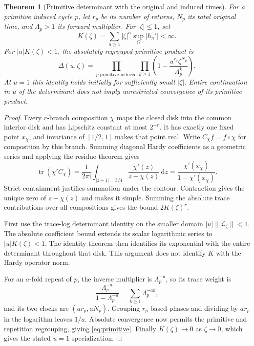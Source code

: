 \documentclass[10pt]{article}
\newcommand{\dd}{\,\mathrm d}
\newcommand{\ii}{\mathrm i}
\newcommand{\LL}{\mathcal L}
\newcommand{\tr}{\operatorname{tr}}
\newtheorem{theorem}{Theorem}
\begin{document}
\begin{theorem}[Primitive determinant with the original and induced times]
For a primitive induced cycle $p$, let $r_p$ be its number of returns,
$N_p$ its total original time, and $\Lambda_p>1$ its forward multiplier.
For $|\zeta|\le1$, set
\begin{equation}
K(\zeta)=\sum_{n\ge1}|\zeta|^n\sup_\Omega|h_n'|<\infty.
\label{eq:K}
\end{equation}
For $|u|K(\zeta)<1$, the absolutely regrouped primitive product is
\begin{equation}
\Delta(u,\zeta)=
\prod_{p\;\text{primitive induced}}\prod_{k\ge1}
\left(1-\frac{u^{r_p}\zeta^{N_p}}{\Lambda_p^k}\right).
\label{eq:primitive}
\end{equation}
At $u=1$ this identity holds initially for sufficiently small $|\zeta|$.
Entire continuation in $u$ of the determinant does not imply unrestricted
convergence of its primitive product.
\end{theorem}
\begin{proof}
Every $r$-branch composition $\chi$ maps the closed disk into the common
interior disk and has Lipschitz constant at most $2^{-r}$. It has exactly one
fixed point $x_\chi$, and invariance of $[1/2,1]$ makes that point real.
Write $C_\chi f=f\circ\chi$ for composition by this branch.
Summing diagonal Hardy coefficients as a geometric series and applying the
residue theorem gives
\begin{equation}
\tr(\chi'C_\chi)=\frac1{2\pi\ii}\int_{|z-1|=3/4}
\frac{\chi'(z)}{z-\chi(z)}\dd z
=\frac{\chi'(x_\chi)}{1-\chi'(x_\chi)}.
\label{eq:trace}
\end{equation}
Strict containment justifies summation under the contour. Contraction gives
the unique zero of $z-\chi(z)$ and makes it simple. Summing the absolute
trace contributions over all compositions gives the bound $2K(\zeta)^r$.

First use the trace-log determinant identity on the smaller domain
$|u|\|\LL_\zeta\|<1$. The absolute coefficient bound extends its scalar
logarithmic series to $|u|K(\zeta)<1$. The identity theorem then identifies
its exponential with the entire determinant throughout that disk.
This argument does not identify $K$ with the Hardy operator norm.

For an $a$-fold repeat of $p$, the inverse multiplier is $\Lambda_p^{-a}$,
so its trace weight is
\begin{equation}
\frac{\Lambda_p^{-a}}{1-\Lambda_p^{-a}}
=\sum_{k\ge1}\Lambda_p^{-ak},
\label{eq:repetitions}
\end{equation}
and its two clocks are $(ar_p,aN_p)$. Grouping $r_p$ based phases and
dividing by $ar_p$ in the logarithm leaves $1/a$. Absolute convergence now
permits the primitive and repetition regrouping, giving
\eqref{eq:primitive}. Finally $K(\zeta)\to0$ as $\zeta\to0$, which gives
the stated $u=1$ specialization.
\end{proof}
\end{document}
